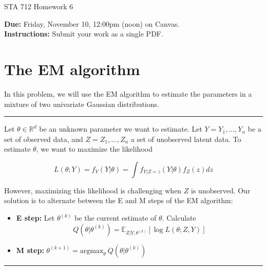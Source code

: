 \documentclass[11pt]{article}
\begin{document}
\begin{center}
\Large
STA 712 Homework 6\\
\normalsize
\vspace{5mm}
\end{center}

\noindent \textbf{Due:} Friday, November 10, 12:00pm (noon) on Canvas.\\ 

\noindent \textbf{Instructions:} Submit your work as a single PDF. 

\section*{The EM algorithm}

In this problem, we will use the EM algorithm to estimate the parameters in a mixture of two univariate Gaussian distributions.\\

\noindent \rule{\textwidth}{1pt}


\noindent Let $\theta \in \mathbb{R}^d$ be an unknown parameter we want to estimate. Let $Y = Y_1,...,Y_n$ be a set of observed data, and $Z = Z_1,...,Z_n$ a set of unobserved latent data. To estimate $\theta$, we want to maximize the likelihood

$$L(\theta; Y) = f_Y(Y|\theta) = \int f_{Y|Z=z}(Y|\theta) f_Z(z) dz$$

\noindent However, maximizing this likelihood is challenging when $Z$ is unobserved. Our solution is to alternate between the E and M steps of the EM algorithm:

\begin{itemize}
\item[]\textbf{E step:} Let $\theta^{(k)}$ be the current estimate of $\theta$. Calculate
$$Q(\theta | \theta^{(k)}) = \mathbb{E}_{Z|Y, \theta^{(k)}} [\log L(\theta; Z, Y)]$$

\item[] \textbf{M step:} $\theta^{(k+1)} = \text{argmax}_\theta \ Q(\theta | \theta^{(k)})$
\end{itemize}

\noindent \rule{\textwidth}{1pt}
\end{document}
